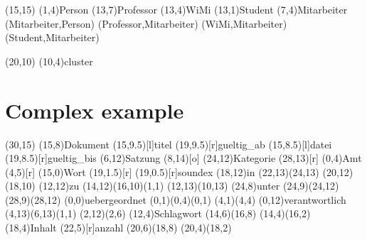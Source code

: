 \documentclass[a4paper,11pt]{article}
\begin{document}
\begin{schema}(15,15)
  \entity(1,4){Person}
  \relation(13,7){Professor}
  \relation(13,4){WiMi}
  \relation(13,1){Student}
  \cluster(7,4){Mitarbeiter}
  \conn(Mitarbeiter,Person){}
  \conn(Professor,Mitarbeiter){}
  \conn(WiMi,Mitarbeiter){}
  \conn(Student,Mitarbeiter){}
\end{schema}

\begin{schema}(20,10)
  \cluster(10,4){cluster}
\end{schema}

\section{Complex example}

\setlength{\hermunit}{.5cm}
\begin{schema}(30,15)
\entity(15,8){Dokument}
\attr(15,9.5)[l]{titel}
\attr(19,9.5)[r]{gueltig\_ab}
\attr(15,8.5)[l]{datei}
\attr(19,8.5)[r]{gueltig\_bis}
%
\entity(6,12){Satzung}
\attr(8,14)[o]{}
%
\entity(24,12){Kategorie}
\attr(28,13)[r]{}
%
\entity(0,4){Amt}
\attr(4,5)[r]{}
%
\entity(15,0){Wort}
\attr(19,1.5)[r]{}
\attr(19,0.5)[r]{soundex}
%
\relation(18,12){in}
\connection(22,13)(24,13){}
\connection(20,12)(18,10){}
%
\relation(12,12){zu}
\connection(14,12)(16,10){(1,1)}
\connection(12,13)(10,13){}
%
\relation(24,8){unter}
\connection(24,9)(24,12){}
\connection(28,9)(28,12){}
%
\relation(0,0){uebergeordnet}
\connection(0,1)(0,4){(0,1)}
\connection(4,1)(4,4){}
%
\relation(0,12){verantwortlich}
\connection(4,13)(6,13){(1,1)}
\connection(2,12)(2,6){}
%
\relation(12,4){Schlagwort}
\connection(14,6)(16,8){}
\connection(14,4)(16,2){}
%
\relation(18,4){Inhalt}
\attr(22,5)[r]{anzahl}
\connection(20,6)(18,8){}
\connection(20,4)(18,2){}
\end{schema}
\end{document}
